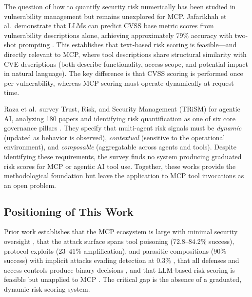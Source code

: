 \documentclass[12pt]{article}
\begin{document}
The question of how to quantify security risk numerically has been studied in vulnerability management but remains unexplored for MCP. Jafarikhah et al.\ demonstrate that LLMs can predict CVSS base metric scores from vulnerability descriptions alone, achieving approximately 79\% accuracy with two-shot prompting \cite{jafarikhah2026description_to_score}. This establishes that text-based risk scoring is feasible---and directly relevant to MCP, where tool descriptions share structural similarity with CVE descriptions (both describe functionality, access scope, and potential impact in natural language). The key difference is that CVSS scoring is performed once per vulnerability, whereas MCP scoring must operate dynamically at request time.

Raza et al.\ survey Trust, Risk, and Security Management (TRiSM) for agentic AI, analyzing 180 papers and identifying risk quantification as one of six core governance pillars \cite{raza2025trism}. They specify that multi-agent risk signals must be \emph{dynamic} (updated as behavior is observed), \emph{contextual} (sensitive to the operational environment), and \emph{composable} (aggregatable across agents and tools). Despite identifying these requirements, the survey finds no system producing graduated risk scores for MCP or agentic AI tool use. Together, these works provide the methodological foundation but leave the application to MCP tool invocations as an open problem.

\subsection{Positioning of This Work}

Prior work establishes that the MCP ecosystem is large with minimal security oversight \cite{hou2025mcp_landscape,li2025understanding_mcp}, that the attack surface spans tool poisoning (72.8--84.2\% success), protocol exploits (23--41\% amplification), and parasitic compositions (90\% success) with implicit attacks evading detection at 0.3\% \cite{ferrag2025prompt_to_protocol,wang2025mcptox,li2026mcp_itp,zhao2025mind_your_server,hu2026log_to_leak}, that all defenses and access controls produce binary decisions \cite{zhou2026mcpshield,xing2026mcp_guard,shi2025progent,buhler2025agentbound,mou2026toolsafe,xiang2025guardagent}, and that LLM-based risk scoring is feasible but unapplied to MCP \cite{jafarikhah2026description_to_score,raza2025trism}. The critical gap is the absence of a graduated, dynamic risk scoring system.
\end{document}
